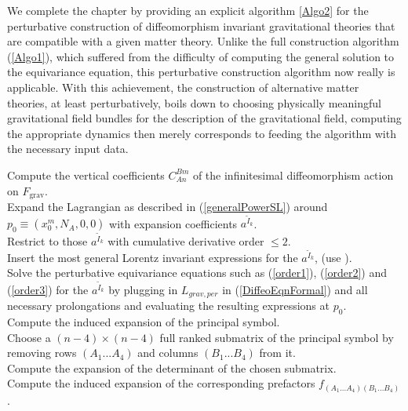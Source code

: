 We complete the chapter by providing an explicit algorithm \ref{Algo2} for the perturbative construction of diffeomorphism invariant gravitational theories that are compatible with a given matter theory. 
Unlike the full construction algorithm (\ref{Algo1}), which suffered from the difficulty of computing the general solution to the equivariance equation, this perturbative construction algorithm now really is applicable. 
With this achievement, the construction of alternative matter theories, at least perturbatively, boils down to choosing physically meaningful gravitational field bundles for the description of the gravitational field, computing the appropriate dynamics then merely corresponds to feeding the algorithm with the necessary input data.  
\begin{algorithm}[hbt!]
\SetAlgoLined
{}
Compute the vertical coefficients $C^{Bm}_{An}$ of the infinitesimal diffeomorphism action on $F_{\text{grav}}$. \\
Expand the Lagrangian as described in (\ref{generalPowerSL}) around $p_0 \equiv (x_0^m,N_A,0,0)$ with expansion coefficients $a^{\tilde{I}_k}$.\\
Restrict to those $a^{\tilde{I}_k}$ with cumulative derivative order $\leq 2$.\\
Insert the most general Lorentz invariant expressions for the $a^{\tilde{I}_k}$, (use \cite{sparse-tensor}).\\
Solve the perturbative equivariance equations such as (\ref{order1}), (\ref{order2}) and (\ref{order3}) for the $a^{\tilde{I}_k}$ by plugging in $L_{grav,per}$ in (\ref{DiffeoEqnFormal}) and all necessary prolongations and evaluating the resulting expressions at $p_0$.\\
Compute the induced expansion of the principal symbol.\\
Choose a $(n-4) \times (n-4)$ full ranked submatrix of the principal symbol by removing rows $(A_1...A_4)$ and columns $(B_1...B_4)$ from it. \\
Compute the expansion of the determinant of the chosen submatrix.\\
Compute the induced expansion of the corresponding prefactors $f_{(A_1...A_4)(B_1...B_4)}$. \\

\end{algorithm}
